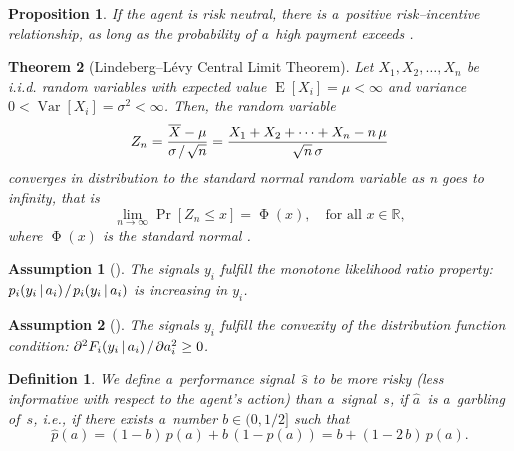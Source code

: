 \documentclass[11pt, a4paper, oneside]{article}
\newcommand{\mathup}[1]{\mathrm{#1}}
\newcommand*{\divslash}{%
	\mathbin{%
		\nonscript\mskip-2mu / \nonscript\mskip-2mu%
	}%
}  %
\renewcommand{\caps}[1]{{\textscale{0.97}{\textls[50]{\MakeUppercase{#1}}}}}
\theoremstyle{Plain}
\newtheorem{theorem}{Theorem}
\newtheorem{proposition}[theorem]{Satz}
\newtheorem{proposition}[theorem]{Proposition}
\theoremstyle{Definition}
\newtheorem{definition}{Definition}
\newtheorem{assumption}{Annahme}
\newtheorem{assumption}{Assumption}
\theoremstyle{Remark}
\begin{document}
\begin{proposition}
	\label{proposition:budde-kraekel-4}
	If the agent is risk neutral, there is a~positive risk--incentive relationship, as long as the probability of a~high payment exceeds \textonehalf.
\end{proposition}

\begin{theorem}[Lindeberg--Lévy Central Limit Theorem]
	\label{theorem:CLT}
	Let $X_1, X_2, \ldots, X_n$ be i.i.d. random variables with expected value ${\operatorname{E}[X_i] = \mu < \infty}$ and variance ${0 < \operatorname{Var}[X_i] = \sigma^2 < \infty}$. Then, the random variable\hfill\null
	\begin{equation*}
		Z_{n}
		= \frac{\overline{X}-\mu}{\sigma \divslash \sqrt{n}}
		= \frac{X_1 + X_2 + \dots + X_{n} - n\,\mu}{\sqrt{n} \, \sigma}
	\end{equation*}
	converges in distribution to the standard normal random variable as n goes to infinity, that is
	\begin{equation*}
		\lim_{n \rightarrow \infty} \Pr[Z_{n} \leq x] = \upPhi(x), \quad \text{for all } x \in \mathbb{R},
	\end{equation*}
	where $\upPhi(x)$ is the standard normal \caps{CDF}.
\end{theorem}

\begin{assumption}[\caps{MLRP}]
	\label{assumption:mlrp}
	The signals $y_i$ fulfill the monotone likelihood ratio property:
	$p_i(y_i \,|\, a_i) \divslash p_i(y_i \,|\, a_i)$ is increasing in $y_i$.
\end{assumption}

\begin{assumption}[\caps{CDFC}]
	\label{assumption:cdfc}
	The signals $y_i$ fulfill the convexity of the distribution function condition:
	$\partial^2 F_i(y_i \,|\, a_i) \divslash \partial a_i^2 \ge 0$.
\end{assumption}

\begin{definition}
	\label{definition:budde-kraekel}
	We define a~performance signal~$\hat{s}$ to be \textit{more risky} (less informative with respect to the agent's action) than a~signal~$s$, if $\hat{a}$~is a~garbling of~$s$, i.e., if there exists a~number ${b \in (0, 1/2]}$ such that
	\begin{equation*}
		\hat{p}(a) = (1 - b) \, p(a) + b \, (1 - p(a)) = b + (1 - 2\,b)\,p(a).
	\end{equation*}
\end{definition}
\end{document}
